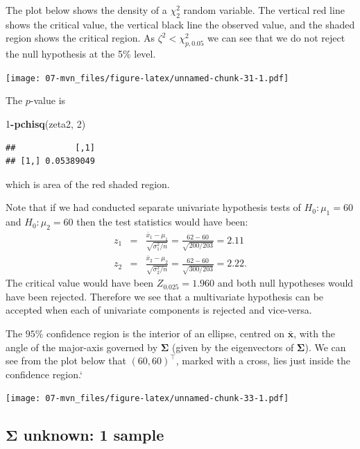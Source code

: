 \documentclass[]{book}
\newenvironment{Shaded}{\begin{snugshade}}{\end{snugshade}}
\newcommand{\DecValTok}[1]{\textcolor[rgb]{0.00,0.00,0.81}{#1}}
\newcommand{\KeywordTok}[1]{\textcolor[rgb]{0.13,0.29,0.53}{\textbf{#1}}}
\newcommand{\NormalTok}[1]{#1}
\newcommand{\OperatorTok}[1]{\textcolor[rgb]{0.81,0.36,0.00}{\textbf{#1}}}
\theoremstyle{definition}
\theoremstyle{definition}
\theoremstyle{definition}
\theoremstyle{remark}
\begin{document}
The plot below shows the density of a \(\chi^2_2\) random variable. The vertical red line shows the critical value, the vertical black line the observed value, and the shaded region shows the critical region. As \(\zeta^2 < \chi^2_{p,0.05}\) we can see that we do not reject the null hypothesis at the 5\% level.

\texttt{[image: 07-mvn\_files/figure-latex/unnamed-chunk-31-1.pdf]}

The \(p\)-value is

\begin{Shaded}
\begin{Highlighting}[]
\DecValTok{1}\OperatorTok{-}\KeywordTok{pchisq}\NormalTok{(zeta2, }\DecValTok{2}\NormalTok{)}
\end{Highlighting}
\end{Shaded}

\begin{verbatim}
##            [,1]
## [1,] 0.05389049
\end{verbatim}

which is area of the red shaded region.

Note that if we had conducted separate univariate hypothesis tests of \(H_0: \mu_1 = 60\) and \(H_0: \mu_2 = 60\) then the test statistics would have been:
\begin{eqnarray*}
z_1 &=& \frac{\bar{x}_1 - \mu_1}{\sqrt{\sigma_1^2/n}} = \frac{62-60}{\sqrt{200/203}} = 2.11  \\
z_2 &=& \frac{\bar{x}_2 - \mu_2}{\sqrt{\sigma_2^2/n}} = \frac{62-60}{\sqrt{300/203}} = 2.22.
\end{eqnarray*}
The critical value would have been \(Z_{0.025} = 1.960\) and both null hypotheses would have been rejected. Therefore we see that a multivariate hypothesis can be accepted when each of univariate components is rejected and vice-versa.

The \(95\)\% confidence region is the interior of an ellipse, centred on \(\bar{\boldsymbol x}\), with the angle of the major-axis governed by \(\boldsymbol \Sigma\) (given by the eigenvectors of \(\boldsymbol \Sigma\)). We can see from the plot below that \((60,60)^\top\), marked with a cross, lies just inside the confidence region.`

\texttt{[image: 07-mvn\_files/figure-latex/unnamed-chunk-33-1.pdf]}

\hypertarget{onesample}{%
\subsection{\texorpdfstring{\(\boldsymbol \Sigma\) unknown: 1 sample}{\textbackslash{}boldsymbol \textbackslash{}Sigma unknown: 1 sample}}\label{onesample}}
\end{document}
